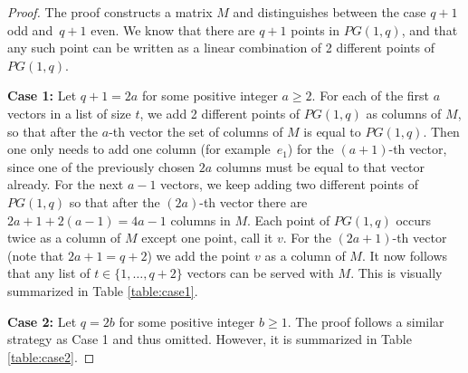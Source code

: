 \documentclass[11pt,a4paper]{article}
\theoremstyle{definition}
\begin{document}
\begin{proof}
The proof constructs a matrix $M$ and distinguishes between the case $q+1$ odd and~$q+1$ even. We know that there are $q+1$ points in $PG(1,q)$, and that any such point can be written as a linear combination of 2 different points of $PG(1,q).$


\textbf{Case 1: }Let $q+1 = 2a$ for some positive integer $a\ge 2$. For each of the first $a$ vectors in a list of size $t$, we add 2 different points of $PG(1,q)$ as columns of $M$, so that after the $a$-th vector the set of columns of $M$ is equal to $PG(1,q).$ Then one only needs to add one column (for example~$e_1$) for the $(a+1)$-th vector, since one of the previously chosen $2a$ columns must be equal to that vector already. For the next $a-1$ vectors, we keep adding two different points of $PG(1,q)$ so that after the $(2a)$-th vector there are $2a+1 + 2(a-1)=4a-1$ columns in $M$. Each point of $PG(1,q)$ occurs twice as a column of $M$ except one point, call it $v$. For the $(2a+1)$-th vector (note that $2a+1=q+2$) we add the point $v$ as a column of $M$. It now follows that any list of $t \in \{1,\ldots,q+2\}$ vectors can be served with $M$. This is visually summarized in Table \ref{table:case1}.

\textbf{Case 2: }Let $q = 2b$ for some positive integer $b \ge 1$. The proof follows a similar strategy as Case 1 and thus omitted. However, it is summarized in Table \ref{table:case2}.


\end{proof}
\end{document}
